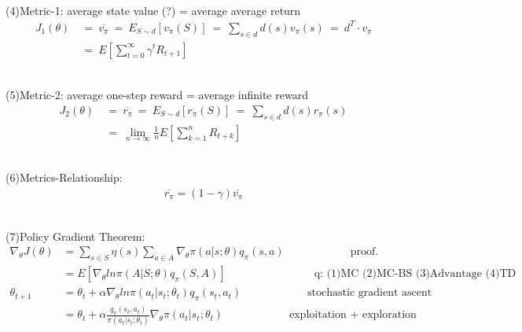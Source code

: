 \documentclass{article}
\begin{document}
~ \\[3pt]
(4)Metric-1: average state value (?) = average average return 
\begin{align*}
    J_{1} (\theta) & \ = \ \overline{v_{\pi}} 
                     \ = \ E_{S \sim d} [ v_{\pi}(S) ] 
                     \ = \ \sum_{s \in d} d(s) v_{\pi}(s) 
                     \ = \ d^{T} \cdot v_{\pi} \\[3pt]
                   & \ = \ E \left[ \sum_{t = 0}^{\infty} 
                                    \gamma^{t} R_{t+1} \right] 
\end{align*}

~ \\[3pt]
(5)Metric-2: average one-step reward = average infinite reward 
\begin{align*}
    J_{2} (\theta) & \ = \ \overline{r_{\pi}} 
                     \ = \ E_{S \sim d} [ r_{\pi}(S) ] 
                     \ = \ \sum_{s \in d} d(s) r_{\pi}(s) \\[3pt]
                   & \ = \ \lim_{n \to \infty} \frac{1}{n} 
                     E \left[ \sum_{k = 1}^{n} R_{t+k} \right] 
\end{align*}

~ \\[3pt]
(6)Metrics-Relationship: 
\begin{align*}
    \overline{r_{\pi}} = (1 - \gamma) \overline{v_{\pi}} 
\end{align*}

~ \\[3pt]
(7)Policy Gradient Theorem: 
\begin{align*}
    \nabla_{\theta} J(\theta) &= \sum_{s \in S} \eta (s) 
    \sum_{a \in A} \nabla_{\theta} \pi (a | s; \theta) q_{\pi} (s, a) 
    \qquad \qquad \qquad \text{proof.} \\[3pt]
    &= E [ \nabla_{\theta} ln \pi (A | S; \theta) q_{\pi} (S, A) ] 
    \qquad \qquad \qquad \qquad 
    \text{q: (1)MC   (2)MC-BS   (3)Advantage   (4)TD} \\[3pt]
    \theta_{t+1} &= \theta_{t} + \alpha \nabla_{\theta} 
                    ln \pi (a_{t} | s_{t}; \theta_{t}) q_{\pi} (s_{t}, a_{t}) 
                    \qquad \qquad \qquad \text{stochastic gradient ascent} \\[3pt]
                 &= \theta_{t} + \alpha 
                 \frac{q_{\pi} (s_{t}, a_{t})}{\pi (a_{t} | s_{t}; \theta_{t})} 
                 \nabla_{\theta} \pi (a_{t} | s_{t}; \theta_{t}) 
                 \qquad \qquad \qquad \text{exploitation + exploration} 
\end{align*}
\end{document}
